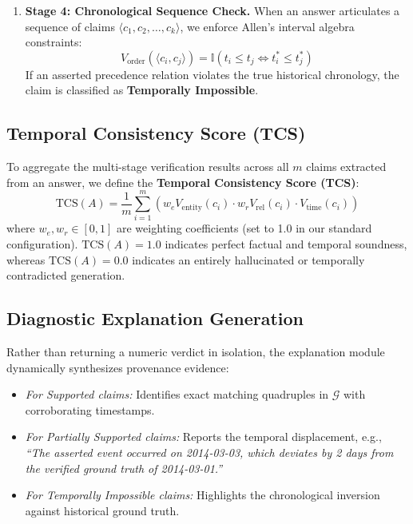 \documentclass[conference]{IEEEtran}
\begin{document}
\begin{enumerate}
    \item \textbf{Stage 4: Chronological Sequence Check.}
    When an answer articulates a sequence of claims $\langle c_1, c_2, \dots, c_k \rangle$, we enforce Allen's interval algebra constraints:
    \begin{equation}
    V_{\mathrm{order}}(\langle c_i, c_j \rangle) = \mathbb{I}\left(t_i \le t_j \iff t^*_i \le t^*_j\right)
    \end{equation}
    If an asserted precedence relation violates the true historical chronology, the claim is classified as \textbf{Temporally Impossible}.
\end{enumerate}

\subsection{Temporal Consistency Score (TCS)}
To aggregate the multi-stage verification results across all $m$ claims extracted from an answer, we define the \textbf{Temporal Consistency Score (TCS)}:
\begin{equation}
\mathrm{TCS}(A) = \frac{1}{m} \sum_{i=1}^m \left( w_e V_{\mathrm{entity}}(c_i) \cdot w_r V_{\mathrm{rel}}(c_i) \cdot V_{\mathrm{time}}(c_i) \right)
\end{equation}
where $w_e, w_r \in [0, 1]$ are weighting coefficients (set to 1.0 in our standard configuration). $\mathrm{TCS}(A) = 1.0$ indicates perfect factual and temporal soundness, whereas $\mathrm{TCS}(A) = 0.0$ indicates an entirely hallucinated or temporally contradicted generation.

\subsection{Diagnostic Explanation Generation}
Rather than returning a numeric verdict in isolation, the explanation module dynamically synthesizes provenance evidence:
\begin{itemize}
    \item \textit{For Supported claims:} Identifies exact matching quadruples in $\mathcal{G}$ with corroborating timestamps.
    \item \textit{For Partially Supported claims:} Reports the temporal displacement, e.g., \textit{``The asserted event occurred on 2014-03-03, which deviates by 2 days from the verified ground truth of 2014-03-01.''}
    \item \textit{For Temporally Impossible claims:} Highlights the chronological inversion against historical ground truth.
\end{itemize}
\end{document}
